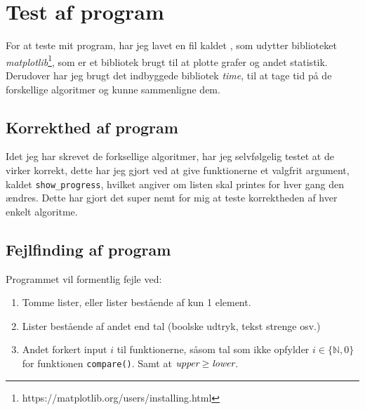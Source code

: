 \documentclass[12pt]{article}
\begin{document}
    \section{Test af program}
    For at teste mit program, har jeg lavet en fil kaldet , som udytter biblioteket \emph{matplotlib}\footnote{https://matplotlib.org/users/installing.html}, som er et bibliotek brugt til at plotte grafer og andet statistik.
    Derudover har jeg brugt det indbyggede bibliotek \emph{time}, til at tage tid på de forskellige algoritmer og kunne sammenligne dem.

        \subsection{Korrekthed af program}
        Idet jeg har skrevet de forksellige algoritmer, har jeg selvfølgelig testet at de virker korrekt, dette har jeg gjort ved at give funktionerne et valgfrit argument, kaldet \texttt{show\_progress}, hvilket angiver om listen skal printes for hver gang den ændres.
        Dette har gjort det super nemt for mig at teste korrektheden af hver enkelt algoritme.


        \subsection{Fejlfinding af program}
        Programmet vil formentlig fejle ved:
        \begin{enumerate}
            \item Tomme lister, eller lister bestående af kun 1 element.
            \item Lister bestående af andet end tal (boolske udtryk, tekst strenge osv.)
            \item Andet forkert input $i$ til funktionerne, såsom tal som ikke opfylder $i \in \{\mathbb{N}, 0\}$ for funktionen \texttt{compare()}. Samt at $\emph{upper} \geq \emph{lower}$.
        \end{enumerate}
\end{document}
